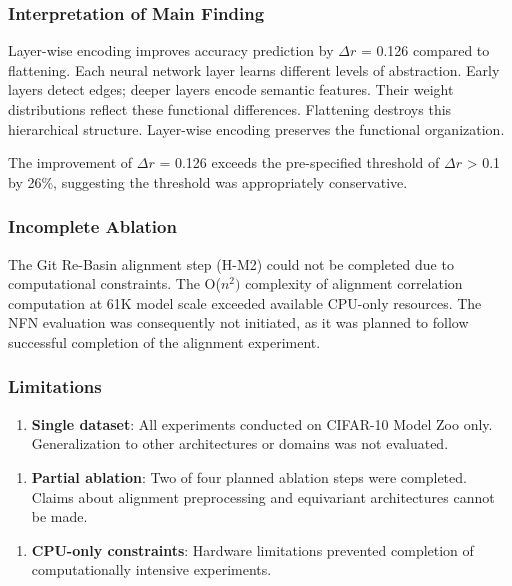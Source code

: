 
\subsubsection{Interpretation of Main Finding}

Layer-wise encoding improves accuracy prediction by $\Delta r$ = 0.126 compared to flattening. Each neural network layer learns different levels of abstraction. Early layers detect edges; deeper layers encode semantic features. Their weight distributions reflect these functional differences. Flattening destroys this hierarchical structure. Layer-wise encoding preserves the functional organization.

The improvement of $\Delta r$ = 0.126 exceeds the pre-specified threshold of $\Delta r$ > 0.1 by 26\%, suggesting the threshold was appropriately conservative.

\subsubsection{Incomplete Ablation}

The Git Re-Basin alignment step (H-M2) could not be completed due to computational constraints. The O($n^{2})$ complexity of alignment correlation computation at 61K model scale exceeded available CPU-only resources. The NFN evaluation was consequently not initiated, as it was planned to follow successful completion of the alignment experiment.

\subsubsection{Limitations}

\begin{enumerate}
\item \textbf{Single dataset}: All experiments conducted on CIFAR-10 Model Zoo only. Generalization to other architectures or domains was not evaluated.
\end{enumerate}

\begin{enumerate}
\item \textbf{Partial ablation}: Two of four planned ablation steps were completed. Claims about alignment preprocessing and equivariant architectures cannot be made.
\end{enumerate}

\begin{enumerate}
\item \textbf{CPU-only constraints}: Hardware limitations prevented completion of computationally intensive experiments.
\end{enumerate}

